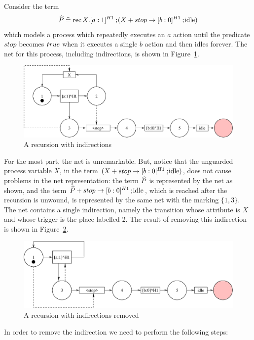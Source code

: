 \begin{exampleb}
Consider the term
\[ {\widehat{P}} \mathrel{\widehat=} \mathrm{rec\,} X.[a:1]^{H1} \mathbin{\mathrm{;}\!} (X \mathbin{\mathrm{+}} stop \rightarrow [b:0]^{H1} \mathbin{\mathrm{;}\!} \mathrm{idle})\]
which models a process which repeatedly executes an $a$ action until
the predicate $stop$ becomes ${true}$ when it executes a single $b$
action and then idles forever. The net for this process, including
indirections, is shown in Figure~\ref{fig:indirection}.   
\begin{figure}[h]
\begin{center}
\includegraphics[width=.8\linewidth]{TGGEN/ind1.eps}
\end{center}
\caption{A recursion with indirections\label{fig:indirection}}
\end{figure}
For the most part, the net is unremarkable. But, notice that the
unguarded process variable $X$, in the term $(X \mathbin{\mathrm{+}} stop \rightarrow
[b:0]^{H1} \mathbin{\mathrm{;}\!} \mathrm{idle})$, does not cause problems in the net
representation: the term ${\widehat{P}}$ is represented by the net as shown, and
the term ${\widehat{P}} \mathbin{\mathrm{+}} stop \rightarrow [b:0]^{H1} \mathbin{\mathrm{;}\!} \mathrm{idle}$, which is
reached after the recursion is unwound, is represented by the same net
with the marking $\{1,3\}$.  The net contains a single indirection,
namely the transition whose attribute is $X$ and whose trigger is the
place labelled 2. The result of removing this indirection is shown in
Figure~\ref{fig:indirectionremoved}.
\begin{figure}[h]
\begin{center}
\includegraphics[width=.8\linewidth]{TGGEN/ind2.eps}
\end{center}
\caption{A recursion with indirections removed\label{fig:indirectionremoved}}
\end{figure}
In order
to remove the indirection we need to perform the following steps:
\begin{enumerate}

\end{enumerate}
\end{exampleb}
